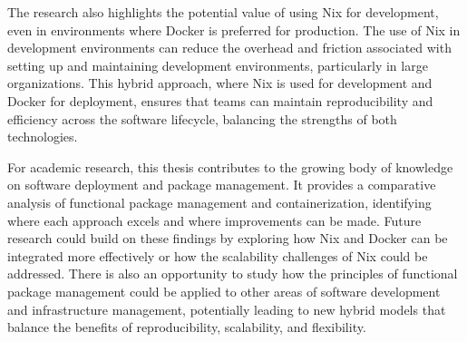 The research also highlights the potential value of using Nix for development, even in
environments where Docker is preferred for production. The use of Nix in development
environments can reduce the overhead and friction associated with setting up and
maintaining development environments, particularly in large organizations. This hybrid
approach, where Nix is used for development and Docker for deployment, ensures that
teams can maintain reproducibility and efficiency across the software lifecycle,
balancing the strengths of both technologies.

For academic research, this thesis contributes to the growing body of knowledge on
software deployment and package management. It provides a comparative analysis of
functional package management and containerization, identifying where each approach
excels and where improvements can be made. Future research could build on these
findings by exploring how Nix and Docker can be integrated more effectively or how
the scalability challenges of Nix could be addressed. There is also an opportunity
to study how the principles of functional package management could be applied to
other areas of software development and infrastructure management, potentially
leading to new hybrid models that balance the benefits of reproducibility,
scalability, and flexibility.
